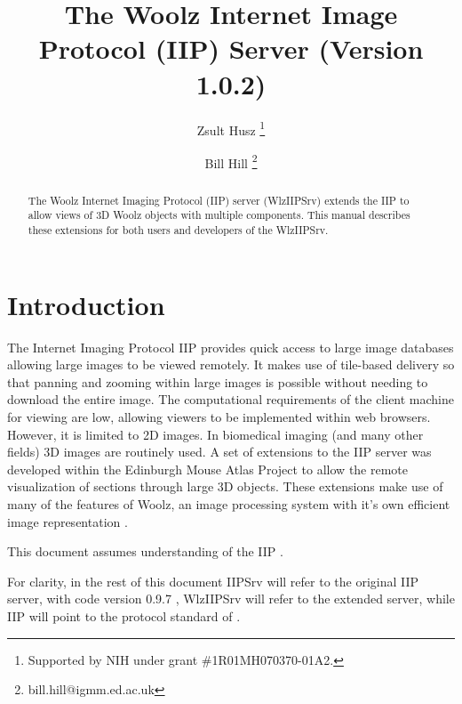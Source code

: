 \documentclass[11pt]{article}
\title{The Woolz Internet Image Protocol (IIP) Server (Version 1.0.2)}
\author{
  Zsult Husz \footnote{Supported by {NIH} under grant \#1R01MH070370-01A2.} \\
  \and
  Bill Hill \footnote{bill.hill@igmm.ed.ac.uk}
}
\begin{document}
\maketitle

\begin{abstract}
The Woolz Internet Imaging Protocol (IIP) server (WlzIIPSrv) extends
the {IIP} to allow views of 3D Woolz objects with multiple components.
This manual describes these extensions for both users and developers
of the WlzIIPSrv.
\end{abstract}


\newpage

\tableofcontents
{}

\newpage


\section{Introduction}

The Internet Imaging Protocol {IIP} provides quick access to large image
databases allowing large images to be viewed remotely. It makes use of
tile-based delivery so that panning and zooming within large images
is  possible without needing to download the entire image.
The computational requirements of the client machine for viewing are low,
allowing viewers to be implemented within web browsers.
However, it is limited to 2D images.
In biomedical imaging (and many other fields) {3D} images are routinely used.
A set of extensions to the {IIP} server was developed within the Edinburgh
Mouse Atlas Project \cite{EMAP} to allow the remote visualization of sections
through large 3D objects.
These extensions make use of many of the features of Woolz, an image
processing system with it's own efficient image representation \cite{WOOLZ}.

This document assumes understanding of the IIP \citep{IIP97}.

For clarity, in the rest of this document IIPSrv will refer to the original
{IIP}  server, with code version 0.9.7 \citep{IIPSRV097}, WlzIIPSrv will refer
to the extended server, while IIP will point to the protocol standard of
\cite{IIP97}.
\end{document}
